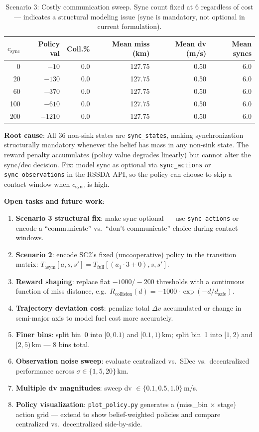 \documentclass[11pt]{article}
\begin{document}
\begin{table}[h]
\centering
\caption{Scenario 3: Costly communication sweep. Sync count fixed at 6 regardless of cost ---
  indicates a structural modeling issue (sync is mandatory, not optional in current formulation).}
\begin{tabular}{rrrrrr}
\toprule
$c_\text{sync}$ & Policy val & Coll.\% & Mean miss (km) & Mean dv (m/s) & Mean syncs \\
\midrule
0   & $-10$    & 0.0 & 127.75 & 0.50 & 6.0 \\
20  & $-130$   & 0.0 & 127.75 & 0.50 & 6.0 \\
60  & $-370$   & 0.0 & 127.75 & 0.50 & 6.0 \\
100 & $-610$   & 0.0 & 127.75 & 0.50 & 6.0 \\
200 & $-1210$  & 0.0 & 127.75 & 0.50 & 6.0 \\
\bottomrule
\end{tabular}
\end{table}

\noindent\textbf{Root cause}: All 36 non-sink states are \texttt{sync\_states}, making
synchronization structurally mandatory whenever the belief has mass in any non-sink state.
The reward penalty accumulates (policy value degrades linearly) but cannot alter the
sync/dec decision. Fix: model sync as optional via \texttt{sync\_actions} or
\texttt{sync\_observations} in the RSSDA API, so the policy can choose to skip a
contact window when $c_\text{sync}$ is high.

\noindent\textbf{Open tasks and future work}:
\begin{enumerate}
  \item \textbf{Scenario 3 structural fix}: make sync optional --- use \texttt{sync\_actions}
        or encode a ``communicate'' vs.\ ``don't communicate'' choice during contact windows.
  \item \textbf{Scenario 2}: encode SC2's fixed (uncooperative) policy in the transition
        matrix: $T_\text{asym}[a, s, s'] = T_\text{full}[(a_1 \cdot 3 + 0), s, s']$.
  \item \textbf{Reward shaping}: replace flat $-1000 / -200$ thresholds with a continuous
        function of miss distance, e.g.\ $R_\text{collision}(d) = -1000 \cdot \exp(-d / d_\text{safe})$.
  \item \textbf{Trajectory deviation cost}: penalize total $\Delta v$ accumulated or
        change in semi-major axis to model fuel cost more accurately.
  \item \textbf{Finer bins}: split bin~0 into $[0, 0.1)$ and $[0.1, 1)$\,km;
        split bin~1 into $[1, 2)$ and $[2, 5)$\,km --- 8 bins total.
  \item \textbf{Observation noise sweep}: evaluate centralized vs.\ SDec vs.\ decentralized
        performance across $\sigma \in \{1, 5, 20\}$\,km.
  \item \textbf{Multiple dv magnitudes}: sweep dv $\in \{0.1, 0.5, 1.0\}$\,m/s.
  \item \textbf{Policy visualization}: \texttt{plot\_policy.py} generates a
        (miss\_bin $\times$ stage) action grid --- extend to show belief-weighted policies
        and compare centralized vs.\ decentralized side-by-side.
\end{enumerate}
\end{document}
